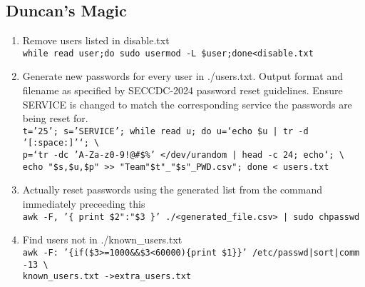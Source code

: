 \documentclass[12pt,letterpaper]{article}
\def\code#1{\textcolor{c2}{\texttt{#1}}}
\begin{document}
\subsection{Duncan's Magic}

\begin{enumerate}
	\item Remove users listed in disable.txt \\
		\code{while read user;do sudo usermod -L \$user;done<disable.txt}
	\item Generate new passwords for every user in ./users.txt. Output format and filename as specified by SECCDC-2024 password reset guidelines. Ensure SERVICE is changed to match the corresponding service the passwords are being reset for. \\
		\code{t='25'; s='SERVICE'; while read u; do u=`echo \$u | tr -d '[:space:]'`; \textbackslash{}\\
		p=`tr -dc 'A-Za-z0-9!@\#\$\%' </dev/urandom | head -c 24; echo`; \textbackslash{}\\
		echo "\$s,\$u,\$p" >{}> "Team"\$t"\_"\$s"\_PWD.csv"; done < users.txt}
	\item Actually reset passwords using the generated list from the command immediately preceeding this \\
		\code{awk -F, '\{ print \$2":"\$3 \}' ./<generated\_file.csv> | sudo chpasswd}
	\item Find users not in ./known\_users.txt \\
		\code{awk -F: '\{if(\$3>=1000\&\&\$3<60000)\{print \$1\}\}' /etc/passwd|sort|comm -13 \textbackslash{} \\
		known\_users.txt ->extra\_users.txt}
\end{enumerate}
\end{document}
